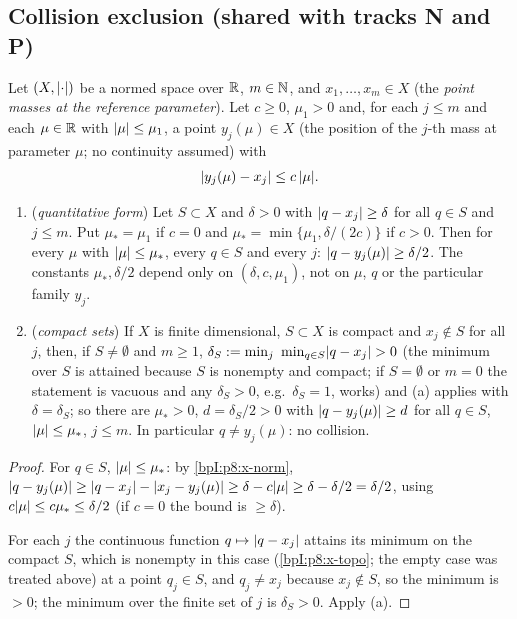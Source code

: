 \subsection{Collision exclusion (shared with tracks N and P)}\label{bpI:p8:sec-coll}

\begin{lemma}\label{bpI:p8:collision-exclusion}
Let $(X,\lvert \cdot\rvert)$ be a normed space over $\mathbb{R}$, $m\in\mathbb{N}$, and $x_1,\dots,x_m\in X$ (the \emph{point masses at the reference parameter}). Let $c\ge0$, $\mu_1>0$ and, for each $j\le m$ and each $\mu\in\mathbb{R}$ with $\lvert \mu\rvert\le\mu_1$,
a point $y_j(\mu)\in X$ (the position of the $j$-th mass at parameter $\mu$; no continuity assumed) with
\[
\lvert y_j(\mu)-x_j\rvert\le c\,\lvert \mu\rvert .
\]
\begin{enumerate}[label=(\alph*)]
\item (\emph{quantitative form}) Let $S\subset X$ and $\delta>0$ with $\lvert q-x_j\rvert\ge\delta$ for all $q\in S$ and $j\le m$. Put $\mu_*=\mu_1$ if $c=0$ and $\mu_*=\min\{\mu_1,\delta/(2c)\}$ if $c>0$. Then for every $\mu$ with $\lvert \mu\rvert\le\mu_*$, every $q\in S$ and every $j$: $\lvert q-y_j(\mu)\rvert\ge\delta/2$.
  The constants $\mu_*,\delta/2$ depend only on $(\delta,c,\mu_1)$, not on $\mu$, $q$ or the particular family $y_j$.
\item (\emph{compact sets}) If $X$ is finite dimensional, $S\subset X$ is compact and $x_j\notin S$ for all $j$, then, if $S\ne\emptyset$ and $m\ge1$, $\delta_S:=\min_{j}\ \min_{q\in S}\lvert q-x_j\rvert>0$ (the minimum over $S$ is attained because $S$ is nonempty and compact; if $S=\emptyset$ or $m=0$ the statement is vacuous and any $\delta_S>0$, e.g.\ $\delta_S=1$, works) and (a) applies with $\delta=\delta_S$; so there are $\mu_*>0$, $d=\delta_S/2>0$ with $\lvert q-y_j(\mu)\rvert\ge d$ for all $q\in S$, $\lvert \mu\rvert\le\mu_*$, $j\le m$. In particular $q\neq y_j(\mu)$: no collision.
\end{enumerate}
\end{lemma}
\begin{proof}
\label{stepI:p8:ce-quant} For $q\in S$, $\lvert \mu\rvert\le\mu_*$: by \ref{bpI:p8:x-norm}, $\lvert q-y_j(\mu)\rvert\ge\lvert q-x_j\rvert-\lvert x_j-y_j(\mu)\rvert\ge\delta-c\lvert \mu\rvert\ge\delta-\delta/2=\delta/2$, using $c\lvert \mu\rvert\le c\mu_*\le\delta/2$ (if $c=0$ the bound is $\ge\delta$).

\label{stepI:p8:ce-compact} For each $j$ the continuous function $q\mapsto\lvert q-x_j\rvert$ attains its minimum on the compact $S$, which is nonempty in this case (\ref{bpI:p8:x-topo}; the empty case was treated above) at a point $q_j\in S$, and $q_j\ne x_j$ because $x_j\notin S$, so the minimum is $>0$; the minimum over the finite set of $j$ is $\delta_S>0$. Apply (a).
\end{proof}

